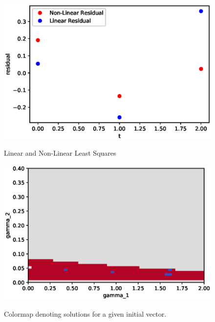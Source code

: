 \documentclass[12pt]{article}
\begin{document}
\begin{figure}[H]
	\caption{Linear and Non-Linear Least Squares}
	\includegraphics[width=1\textwidth]{hwch9_p15_figure_5}
	\label{p15res}
	\centering
\end{figure}

\begin{figure}[h]
	\caption{Colormap denoting solutions for a given initial vector.}
	\includegraphics[width=1\textwidth]{hwch9_p15_figure_3}
	\label{p15solu}
	\centering
\end{figure}
\end{document}
